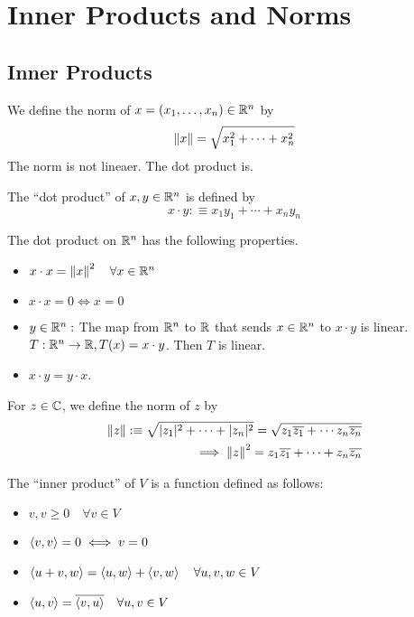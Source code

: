 \section{Inner Products and Norms}

\subsection{Inner Products}
We define the norm of $x=(x_1, \ldots, x_n) \in \mathbb{R}^n$ by
\begin{equation}
  \left \lVert x \right \rVert = \sqrt{x_1^2 + \cdots + x_n^2}
\end{equation}
The norm is not lineaer. The dot product is.

\begin{mydef} 
  The ``dot product'' of $x,y \in \mathbb{R}^n$ is defined by
  \begin{equation}
    x \cdot y :\equiv x_1 y_1 + \cdots + x_n y_n
  \end{equation}
\end{mydef}

The dot product on $\mathbb{R}^n$ has the following properties.
\begin{itemize}
  \item $x \cdot x = \left \lVert x \right \rVert^2 \quad \forall x \in \mathbb{R}^n$ 
  \item $x \cdot x = 0 \iff x= 0$
  \item $y\in \mathbb{R}^n:$ The map from $\mathbb{R}^n$ to $\mathbb{R}$ that sends $x \in \mathbb{R}^n$ to $x\cdot y$ is linear. \\
  $T: \mathbb{R}^n \to \mathbb{R}, T(x) = x \cdot y$. Then $T$ is linear.
  \item $x \cdot y = y \cdot x$.
\end{itemize}

For $z \in \mathbb{C}$, we define the norm of $z$ by
\begin{equation}
  \begin{aligned}
    \left \lVert z \right \rVert :\equiv \sqrt{ |z_1|^2 + \cdots + |z_n|^2} = \sqrt{ z_1 \overline {z_1} + \cdots z_n \overline {z_n}} \\
    \implies \left \lVert z \right \rVert^2 = z_1 \overline{z_1} + \cdots + z_n \overline{z_n}
  \end{aligned}
\end{equation}

\begin{mydef} 
  The ``inner product'' of $V$ is a function defined as follows:
  \begin{itemize}
    \item {} $
    {v,v} \geq 0 \quad \forall v \in V$
    \item {} $\left \langle v, v \right \rangle = 0 \iff v=0$
    \item {} $\left \langle u+v, w \right \rangle=\left \langle u, w \right \rangle+\left \langle v, w \right \rangle \quad \forall u,v,w \in V$
    \item {} $\left \langle u, v \right \rangle = \overline{\left \langle v, u \right \rangle} \quad \forall u, v \in V$ 
  \end{itemize}
\end{mydef}

